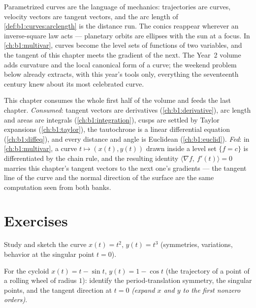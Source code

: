 \begin{remark}
\label{rem:b1:curves:whereused}
Parametrized curves are the language of mechanics: trajectories
are curves, velocity vectors are tangent vectors, and the arc
length of \cref{def:b1:curves:arclength} is the distance run. The
conics reappear wherever an inverse-square law acts --- planetary
orbits are ellipses with the sun at a focus. In
\cref{ch:b1:multivar}, curves become the level sets of functions
of two variables, and the tangent of this chapter meets the
gradient of the next. The Year~2 volume adds curvature and the
local canonical form of a curve; the weekend problem below
already extracts, with this year's tools only, everything the
seventeenth century knew about its most celebrated curve.
\end{remark}

\begin{remark}
\label{rem:b1:curves:perspectives}
This chapter consumes the whole first half of the volume and
feeds the last chapter. \emph{Consumed}: tangent vectors are
derivatives (\cref{ch:b1:derivative}), arc length and areas are
integrals (\cref{ch:b1:integration}), cusps are settled by
Taylor expansions (\cref{ch:b1:taylor}), the tautochrone is a
linear differential equation (\cref{ch:b1:diffeq}), and every
distance and angle is Euclidean (\cref{ch:b1:euclid}).
\emph{Fed}: in \cref{ch:b1:multivar}, a curve $t \mapsto (x(t),
y(t))$ drawn inside a level set $\{f = c\}$ is differentiated by
the chain rule, and the resulting identity $\langle \nabla f,\
f'(t)\rangle = 0$ marries this chapter's tangent vectors to the
next one's gradients --- the tangent line of the curve and the
normal direction of the surface are the same computation seen
from both banks.
\end{remark}

\section{Exercises}

\begin{exercise}[$\star$]\label{exo:b1:curves:1}
Study and sketch the curve $x(t) = t^2$, $y(t) = t^3$ (symmetries,
variations, behavior at the singular point $t = 0$).
\end{exercise}

\begin{exercise}[$\star$]\label{exo:b1:curves:2}
For the cycloid $x(t) = t - \sin t$, $y(t) = 1 - \cos t$ (the
trajectory of a point of a rolling wheel of radius $1$): identify
the period-translation symmetry, the singular points, and the
tangent direction at $t = 0$ \emph{(expand $x$ and $y$ to the first
nonzero orders)}.
\end{exercise}

